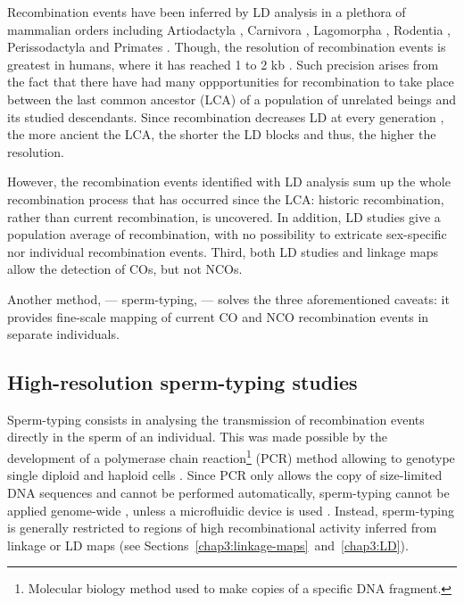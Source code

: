 Recombination events have been inferred by LD analysis in a plethora of mammalian orders including Artiodactyla \citep{farnir2000extensive,mcrae2002linkage,nsengimana2004linkage}, Carnivora \citep{menotti-raymond1999genetic,sutter2004extensive,verardi2006detecting}, Lagomorpha \citep{carneiro2011genetic}, Rodentia \citep{brunschwig2012finescale}, Perissodactyla \citep{corbin2010linkage, mccue2012high} and Primates \citep{auton2012finescale}.
Though, the resolution of recombination events is greatest in humans, where it has reached 1 to 2 kb \citep{theinternationalhapmapconsortium2007seconda, hinch2011landscape, the1000genomesprojectconsortium2015global}.
Such precision arises from the fact that there have had many oppportunities for recombination to take place between the last common ancestor (LCA) of a population of unrelated beings and its studied descendants.
Since recombination decreases LD at every generation \citep{slatkin2008linkage}, the more ancient the LCA, the shorter the LD blocks and thus, the higher the resolution.

However, the recombination events identified with LD analysis sum up the whole recombination process that has occurred since the LCA\@: historic recombination, rather than current recombination, is uncovered.
In addition, LD studies give a population average of recombination, with no possibility to extricate sex-specific nor individual recombination events.
Third, both LD studies and linkage maps allow the detection of COs, but not NCOs.

Another method, — sperm-typing, — solves the three aforementioned caveats: it provides fine-scale mapping of current CO and NCO recombination events in separate individuals.





\subsection{High-resolution sperm-typing studies}%

Sperm-typing consists in analysing the transmission of recombination events directly in the sperm of an individual.
This was made possible by the development of a polymerase chain reaction\footnote{Molecular biology method used to make copies of a specific DNA fragment.} (PCR) method allowing to genotype single diploid and haploid cells \citep{li1988amplification}.
Since PCR only allows the copy of size-limited DNA sequences and cannot be performed automatically, sperm-typing cannot be applied genome-wide \citep{coop2008highresolutiona}, unless a microfluidic device is used \citep{fan2011wholegenome,wang2012genomewide}.
Instead, sperm-typing is generally restricted to regions of high recombinational activity inferred from linkage or LD maps (see Sections~\ref{chap3:linkage-maps}~and~\ref{chap3:LD}).\\

